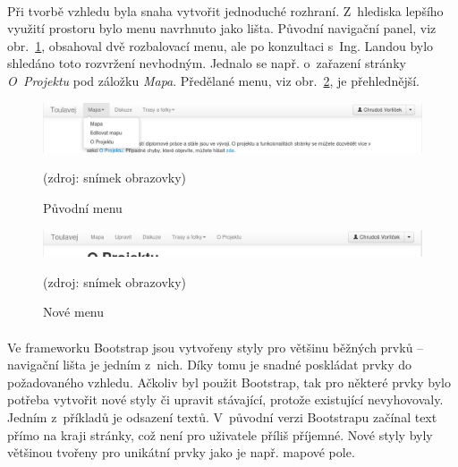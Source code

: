 \documentclass[11pt,a4paper,titlepage,oneside]{book}
\begin{document}
			\paragraph{} Při tvorbě vzhledu byla snaha vytvořit jednoduché rozhraní. Z~hlediska lepšího využití prostoru bylo menu navrhnuto jako lišta. Původní navigační panel, viz obr.~\ref{fig:menu_puv}, obsahoval dvě rozbalovací menu, ale po konzultaci s~Ing. Landou bylo shledáno toto rozvržení nevhodným. Jednalo se např. o~zařazení stránky \textit{O~Projektu} pod záložku \textit{Mapa}. Předělané menu, viz obr.~\ref{fig:menu_nove}, je přehlednější.


		\begin{figure}[!h]
			\begin{center}
				\includegraphics[width=12cm]{obrazky/toulavej/menu_puv.png}
				\caption{Původní menu}
				\label{fig:menu_puv}
                                (zdroj: snímek obrazovky)
			\end{center}
		\end{figure}	

		\begin{figure}[!h]
			\begin{center}
				\includegraphics[width=12cm]{obrazky/toulavej/menu_nove.png}
				\caption{Nové menu}
				\label{fig:menu_nove}
				(zdroj: snímek obrazovky)
			\end{center}
		\end{figure}	
			\paragraph{} Ve frameworku Bootstrap jsou vytvořeny styly pro většinu běžných prvků -- navigační lišta je jedním z~nich. Díky tomu je snadné poskládat prvky do požadovaného vzhledu. Ačkoliv byl použit Bootstrap, tak pro některé prvky bylo potřeba vytvořit nové styly či upravit stávající, protože existující nevyhovovaly. Jedním z~příkladů je odsazení textů. V~původní verzi Bootstrapu začínal text přímo na kraji stránky, což není pro uživatele příliš příjemné. Nové styly byly většinou tvořeny pro unikátní prvky jako je např. mapové pole.
\end{document}

